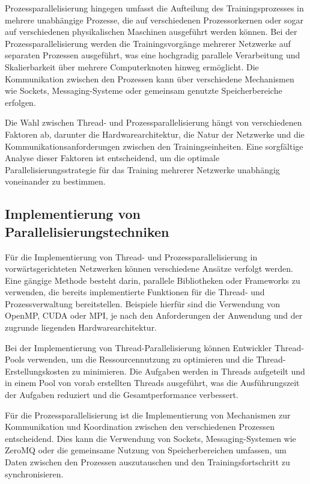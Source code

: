 Prozessparallelisierung hingegen umfasst die Aufteilung des Trainingsprozesses in mehrere unabhängige Prozesse, die auf verschiedenen Prozessorkernen oder sogar auf verschiedenen physikalischen Maschinen ausgeführt werden können. Bei der Prozessparallelisierung werden die Trainingsvorgänge mehrerer Netzwerke auf separaten Prozessen ausgeführt, was eine hochgradig parallele Verarbeitung und Skalierbarkeit über mehrere Computerknoten hinweg ermöglicht. Die Kommunikation zwischen den Prozessen kann über verschiedene Mechanismen wie Sockets, Messaging-Systeme oder gemeinsam genutzte Speicherbereiche erfolgen.

Die Wahl zwischen Thread- und Prozessparallelisierung hängt von verschiedenen Faktoren ab, darunter die Hardwarearchitektur, die Natur der Netzwerke und die Kommunikationsanforderungen zwischen den Trainingseinheiten. Eine sorgfältige Analyse dieser Faktoren ist entscheidend, um die optimale Parallelisierungsstrategie für das Training mehrerer Netzwerke unabhängig voneinander zu bestimmen.

\subsection{Implementierung von Parallelisierungstechniken}
\label{sec:Grundlagen_Parallelisierung_Implementierung}
Für die Implementierung von Thread- und Prozessparallelisierung in vorwärtsgerichteten Netzwerken können verschiedene Ansätze verfolgt werden. Eine gängige Methode besteht darin, parallele Bibliotheken oder Frameworks zu verwenden, die bereits implementierte Funktionen für die Thread- und Prozessverwaltung bereitstellen. Beispiele hierfür sind die Verwendung von OpenMP, CUDA oder MPI, je nach den Anforderungen der Anwendung und der zugrunde liegenden Hardwarearchitektur.

Bei der Implementierung von Thread-Parallelisierung können Entwickler Thread-Pools verwenden, um die Ressourcennutzung zu optimieren und die Thread-Erstellungskosten zu minimieren. Die Aufgaben werden in Threads aufgeteilt und in einem Pool von vorab erstellten Threads ausgeführt, was die Ausführungszeit der Aufgaben reduziert und die Gesamtperformance verbessert.

Für die Prozessparallelisierung ist die Implementierung von Mechanismen zur Kommunikation und Koordination zwischen den verschiedenen Prozessen entscheidend. Dies kann die Verwendung von Sockets, Messaging-Systemen wie ZeroMQ oder die gemeinsame Nutzung von Speicherbereichen umfassen, um Daten zwischen den Prozessen auszutauschen und den Trainingsfortschritt zu synchronisieren.

